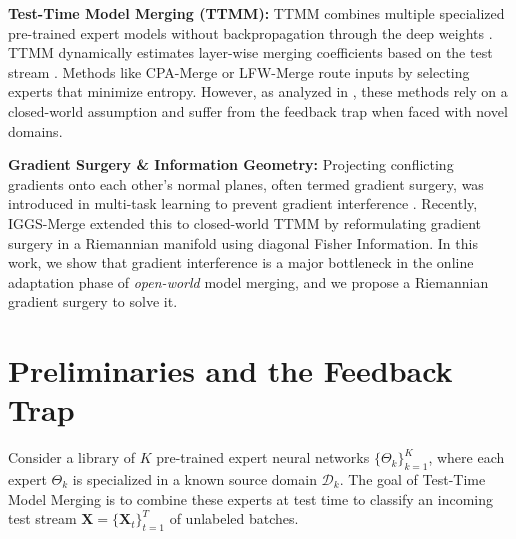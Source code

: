 \documentclass{article}
\theoremstyle{plain}
\theoremstyle{definition}
\theoremstyle{remark}
\begin{document}
\textbf{Test-Time Model Merging (TTMM):} TTMM combines multiple specialized pre-trained expert models without backpropagation through the deep weights \cite{matena2021, wortsman2022}. TTMM dynamically estimates layer-wise merging coefficients based on the test stream \cite{wang2024}. Methods like CPA-Merge \cite{wang2024} or LFW-Merge \cite{submission2} route inputs by selecting experts that minimize entropy. However, as analyzed in \cite{submission8}, these methods rely on a closed-world assumption and suffer from the feedback trap when faced with novel domains.

\textbf{Gradient Surgery \& Information Geometry:} Projecting conflicting gradients onto each other's normal planes, often termed gradient surgery, was introduced in multi-task learning to prevent gradient interference \cite{yu2020gradient, yadav2023a}. Recently, IGGS-Merge \cite{submission7} extended this to closed-world TTMM by reformulating gradient surgery in a Riemannian manifold using diagonal Fisher Information. In this work, we show that gradient interference is a major bottleneck in the online adaptation phase of \textit{open-world} model merging, and we propose a Riemannian gradient surgery to solve it.

\section{Preliminaries and the Feedback Trap}
\label{submission-sec3}
Consider a library of $K$ pre-trained expert neural networks $\{\Theta_k\}_{k=1}^K$, where each expert $\Theta_k$ is specialized in a known source domain $\mathcal{D}_k$. The goal of Test-Time Model Merging is to combine these experts at test time to classify an incoming test stream $\mathbf{X} = \{\mathbf{X}_t\}_{t=1}^T$ of unlabeled batches.
\end{document}
